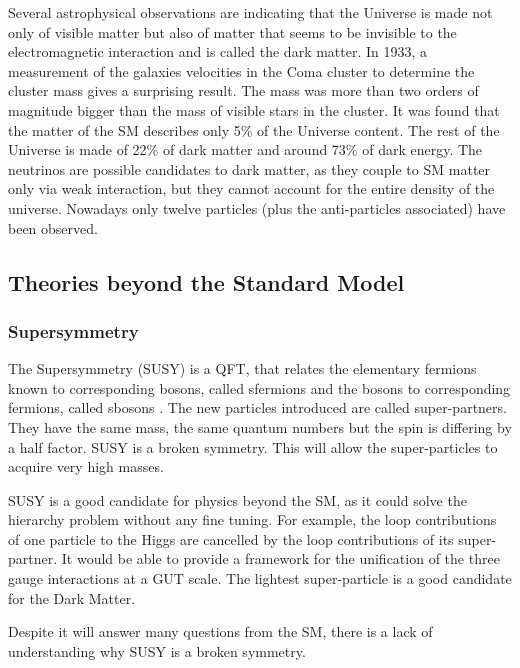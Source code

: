       Several astrophysical observations are indicating that the Universe is made not only of visible matter but also of matter that seems to be invisible to the electromagnetic interaction and is called the dark matter.
      In 1933, a measurement of the galaxies velocities in the Coma cluster to determine the cluster mass gives a surprising result.
      The mass was more than two orders of magnitude bigger than the mass of visible stars in the cluster.
      It was found that the matter of the \gls{SM} describes only 5\% of the Universe content. 
      The rest of the Universe is made of 22\% of dark matter and around 73\% of dark energy.
      The neutrinos are possible candidates to dark matter, as they couple to \gls{SM} matter only via weak interaction, but they cannot account for the entire density of the universe.
      Nowadays only twelve particles (plus the anti-particles associated) have been observed. 

    \subsection{Theories beyond the Standard Model}

      \subsubsection{Supersymmetry}
    
      The Supersymmetry (SUSY) is a QFT, that relates the elementary fermions known to corresponding bosons, called sfermions and the bosons to corresponding fermions, called sbosons \cite{Signer2009}.
      The new particles introduced are called super-partners.
      They have the same mass, the same quantum numbers but the spin is differing by a half factor.
      SUSY is a broken symmetry. 
      This will allow the super-particles to acquire very high masses.

      SUSY is a good candidate for physics beyond the \gls{SM}, as it could solve the hierarchy problem without any fine tuning.
      For example, the loop contributions of one particle to the Higgs are cancelled by the loop contributions of its super-partner.
      It would be able to provide a framework for the unification of the three gauge interactions at a GUT scale.
      The lightest super-particle is a good candidate for the Dark Matter.

      Despite it will answer many questions from the \gls{SM}, there is a lack of understanding why SUSY is a broken symmetry.
      

